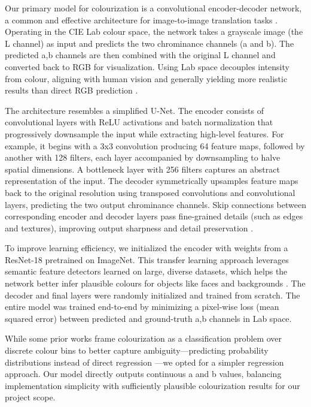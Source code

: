 \documentclass{article} %
\begin{document}
Our primary model for colourization is a convolutional encoder-decoder network, a common and effective architecture for image-to-image translation tasks \citep{leatvanich2025image}. 
Operating in the CIE Lab colour space, the network takes a grayscale image (the L channel) as input and predicts the two chrominance channels (a and b). The predicted a,b channels 
are then combined with the original L channel and converted back to RGB for visualization. Using Lab space decouples intensity from colour, aligning with human vision and generally 
yielding more realistic results than direct RGB prediction \citep{leatvanich2025image}.

The architecture resembles a simplified U-Net. The encoder consists of convolutional layers with ReLU activations and batch normalization that progressively downsample the input while 
extracting high-level features. For example, it begins with a 3x3 convolution producing 64 feature maps, followed by another with 128 filters, each layer accompanied by downsampling 
to halve spatial dimensions. A bottleneck layer with 256 filters captures an abstract representation of the input. The decoder symmetrically upsamples feature maps back to the original 
resolution using transposed convolutions and convolutional layers, predicting the two output chrominance channels. Skip connections between corresponding encoder and decoder layers pass 
fine-grained details (such as edges and textures), improving output sharpness and detail preservation \citep{leatvanich2025image}.

To improve learning efficiency, we initialized the encoder with weights from a ResNet-18 pretrained on ImageNet. This transfer learning approach leverages semantic feature detectors 
learned on large, diverse datasets, which helps the network better infer plausible colours for objects like faces and backgrounds \citep{olah2022lettherebecolor}. The decoder and final 
layers were randomly initialized and trained from scratch. The entire model was trained end-to-end by minimizing a pixel-wise loss (mean squared error) between predicted and ground-truth 
a,b channels in Lab space.

While some prior works frame colourization as a classification problem over discrete colour bins to better capture ambiguity—predicting probability distributions instead of direct 
regression \citep{olah2022lettherebecolor}—we opted for a simpler regression approach. Our model directly outputs continuous a and b values, balancing implementation simplicity with 
sufficiently plausible colourization results for our project scope.
\end{document}
